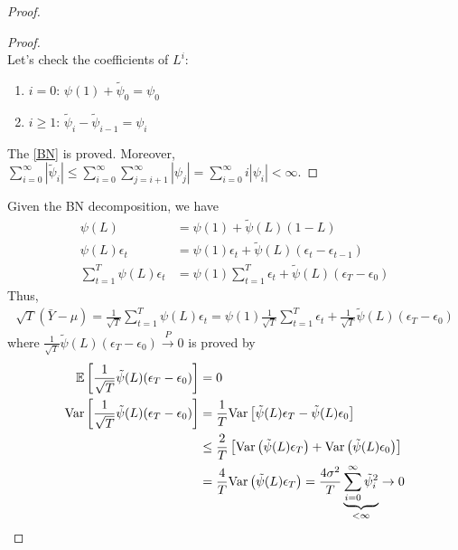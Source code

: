 \documentclass[11pt]{elegantbook}
\begin{document}
\begin{proof}
\begin{proof}
\begin{equation}
            \nonumber
        \end{equation}
        Let's check the coefficients of $L^i$:
        \begin{enumerate}
            \item $i=0$: $\psi(1)+\tilde{\psi}_0=\psi_0$
            \item $i\geq 1$: $\tilde{\psi}_i-\tilde{\psi}_{i-1}=\psi_{i}$
        \end{enumerate}
        The \eqref{BN} is proved. Moreover, $\sum_{i=0}^\infty |\tilde{\psi}_i|\leq \sum_{i=0}^\infty\sum_{j=i+1}^\infty|\psi_j|=\sum_{i=0}^\infty i|\psi_i|<\infty$.
    \end{proof}
    Given the BN decomposition, we have
    \begin{equation}
        \begin{aligned}
            \psi(L)&=\psi(1)+\tilde{\psi}(L)(1-L)\\
            \psi(L)\epsilon_t&=\psi(1)\epsilon_t+\tilde{\psi}(L)(\epsilon_t-\epsilon_{t-1})\\
            \sum_{t=1}^T\psi(L)\epsilon_t&=\psi(1)\sum_{t=1}^T\epsilon_t+\tilde{\psi}(L)(\epsilon_T-\epsilon_0)
        \end{aligned}
        \nonumber
    \end{equation}
    Thus,
    \begin{equation}
        \begin{aligned}
            \sqrt{T}\left(\bar{Y}-\mu\right)=\frac{1}{\sqrt{T}}\sum_{t=1}^T\psi(L)\epsilon_t=\psi(1)\frac{1}{\sqrt{T}}\sum_{t=1}^T\epsilon_t+\frac{1}{\sqrt{T}}\tilde{\psi}(L)(\epsilon_T-\epsilon_0)
        \end{aligned}
        \nonumber
    \end{equation}
    where $\frac{1}{\sqrt{T}}\tilde{\psi}(L)(\epsilon_T-\epsilon_0) \stackrel{P}{\longrightarrow} 0$ is proved by
    \begin{equation}
        \begin{aligned}
            \mathbb{E}\left[\frac{1}{\sqrt{T}}\tilde{\psi}(L)(\epsilon_T-\epsilon_0)\right]&=0\\
            \textnormal{Var}\left[\frac{1}{\sqrt{T}}\tilde{\psi}(L)(\epsilon_T-\epsilon_0)\right]&=\frac{1}{T}\textnormal{Var}\left[\tilde{\psi}(L)\epsilon_T-\tilde{\psi}(L)\epsilon_0\right]\\
            &\leq \frac{2}{T}\left[\textnormal{Var}\left(\tilde{\psi}(L)\epsilon_T\right)+\textnormal{Var}\left(\tilde{\psi}(L)\epsilon_0\right)\right]\\
            &=\frac{4}{T}\textnormal{Var}\left(\tilde{\psi}(L)\epsilon_T\right)=\frac{4\sigma^2}{T}\underbrace{\sum_{i=0}^\infty \tilde{\psi}_i^2}_{<\infty} \rightarrow 0
        \end{aligned}
        \nonumber
    \end{equation}
\end{proof}
\end{document}
